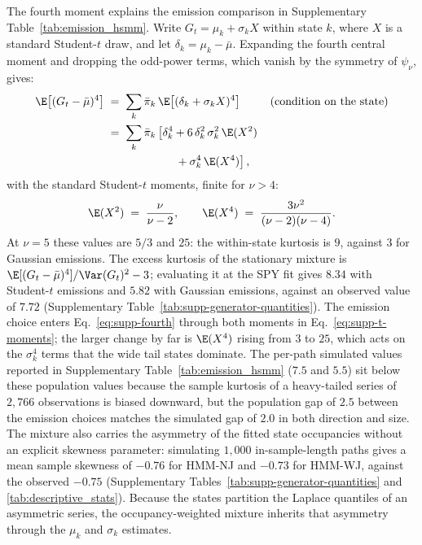 The fourth moment explains the emission comparison in
Supplementary Table~\ref{tab:emission_hsmm}. Write $G_t = \mu_k +
\sigma_k X$ within state $k$, where $X$ is a standard Student-$t$
draw, and let $\delta_k = \mu_k - \bar\mu$. Expanding the fourth
central moment and dropping the odd-power terms, which vanish by the
symmetry of $\psi_\nu$, gives:
\begin{align}
  \E\big[(G_t - \bar\mu)^4\big]
   &\;=\; \sum_k \bar\pi_k\,
     \E\big[(\delta_k + \sigma_k X)^4\big]
     && \text{(condition on the state)} \notag \\
   &\;=\; \sum_k \bar\pi_k \left[
     \delta_k^4
     + 6\, \delta_k^2\, \sigma_k^2\, \E(X^2)\right. \notag \\
   &\hspace{6em}\left.{}
     + \sigma_k^4\, \E(X^4)
     \right],
  \label{eq:supp-fourth}
\end{align}
with the standard Student-$t$ moments, finite for $\nu > 4$:
\begin{equation}
  \E(X^2) \;=\; \frac{\nu}{\nu - 2},
  \qquad
  \E(X^4) \;=\; \frac{3 \nu^2}{(\nu - 2)(\nu - 4)}.
  \label{eq:supp-t-moments}
\end{equation}
At $\nu = 5$ these values are $5/3$ and $25$: the within-state
kurtosis is $9$, against $3$ for Gaussian emissions. The excess kurtosis of the stationary mixture is
$\E[(G_t - \bar\mu)^4] / \Var(G_t)^2 - 3$; evaluating it at the SPY
fit gives $8.34$ with Student-$t$ emissions and $5.82$ with Gaussian
emissions, against an observed value of $7.72$
(Supplementary Table~\ref{tab:supp-generator-quantities}). The emission choice enters
Eq.~\eqref{eq:supp-fourth} through both moments in
Eq.~\eqref{eq:supp-t-moments}; the larger change by far is
$\E(X^4)$ rising from $3$ to $25$, which acts on the $\sigma_k^4$
terms that the wide tail states dominate. The per-path simulated values reported in
Supplementary Table~\ref{tab:emission_hsmm} ($7.5$ and $5.5$) sit
below these population values because the sample kurtosis of a
heavy-tailed series of $2{,}766$ observations is biased downward, but
the population gap of $2.5$ between the emission choices matches the
simulated gap of $2.0$ in both direction and size. The mixture also
carries the asymmetry of the fitted state occupancies without an
explicit skewness parameter: simulating $1{,}000$ in-sample-length
paths gives a mean sample skewness of $-0.76$ for HMM-NJ and $-0.73$
for HMM-WJ, against the observed $-0.75$
(Supplementary Tables~\ref{tab:supp-generator-quantities}
and \ref{tab:descriptive_stats}). Because the states partition the
Laplace quantiles of an asymmetric series, the occupancy-weighted
mixture inherits that asymmetry through the $\mu_k$ and $\sigma_k$
estimates.

